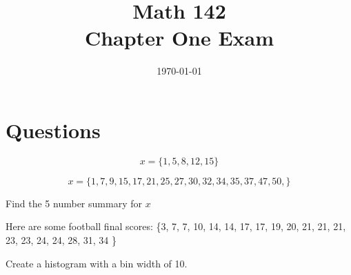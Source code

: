\documentclass[letterpaper]{exam}
\title{Math 142 \\ Chapter One Exam}
\date{\today}
\author{}
\begin{document}
  \maketitle


  \section{Questions}

  \begin{questions}
    
    \question
      \[
         x = \{ 1, 5, 8, 12, 15 \}
      \]


    \question[5]
      \[
        x = \{ 1, 7, 9, 15, 17, 21, 25, 27, 30, 32, 34, 35, 37, 47, 50, \}
      \]

      Find the 5 number summary for $x$

    \question[10]

    Here are some football final scores:
     \{3, 7, 7, 10, 14, 14, 17, 17, 19, 20, 21, 21, 21, 23, 23, 24, 24, 
       28, 31, 34 \}      
   
   \begin{parts}
        Create a histogram with a bin width of 10.
      \end{parts}
  \end{questions}
\end{document}
